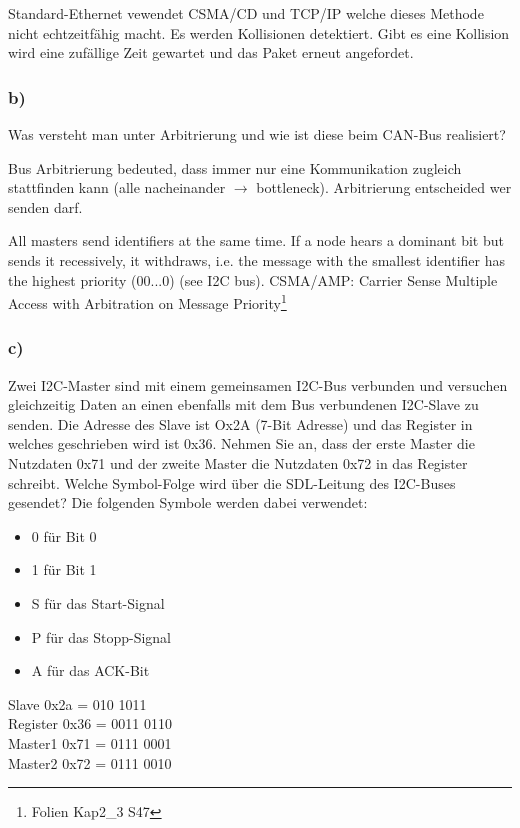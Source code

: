 Standard-Ethernet vewendet CSMA/CD und TCP/IP welche dieses Methode nicht echtzeitfähig macht. Es werden
Kollisionen detektiert. Gibt es eine Kollision wird eine zufällige Zeit gewartet und das Paket erneut angefordet.

\subsubsection{b)}
Was versteht man unter Arbitrierung und wie ist diese beim CAN-Bus realisiert?

Bus Arbitrierung bedeuted, dass immer nur eine Kommunikation zugleich stattfinden kann (alle nacheinander $\rightarrow$ bottleneck).
Arbitrierung entscheided wer senden darf.

All masters send identifiers at the same time. If a node hears a dominant bit
but sends it recessively, it withdraws, i.e. the message with the smallest
identifier has the highest priority (00...0) (see I2C bus).
CSMA/AMP: Carrier Sense Multiple Access with Arbitration on Message
Priority\footnote{Folien Kap2\_3 S47}

\subsubsection{c)}
Zwei I2C-Master sind mit einem gemeinsamen I2C-Bus verbunden und versuchen gleichzeitig Daten an einen ebenfalls 
mit dem Bus verbundenen I2C-Slave zu senden. Die Adresse des Slave ist Ox2A (7-Bit Adresse) und das Register in 
welches geschrieben wird ist 0x36. Nehmen Sie an, dass der erste Master die Nutzdaten 0x71 und der zweite Master 
die Nutzdaten 0x72 in das Register schreibt. Welche Symbol-Folge wird über die SDL-Leitung des I2C-Buses gesendet? 
Die folgenden Symbole werden dabei verwendet: 

\begin{itemize}
  \item 0 für Bit 0
  \item 1 für Bit 1
  \item S für das Start-Signal
  \item P für das Stopp-Signal
  \item A für das ACK-Bit
\end{itemize}
Slave 0x2a = 010 1011\\
Register 0x36 = 0011 0110\\
Master1 0x71 = 0111 0001\\
Master2 0x72 = 0111 0010\\

